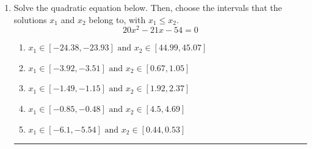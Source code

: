 \documentclass[14pt]{extbook}
\newcommand{\litem}[1]{\item#1\hspace*{-1cm}\rule{\textwidth}{0.4pt}}
\begin{document}
\begin{enumerate}
\litem{
Solve the quadratic equation below. Then, choose the intervals that the solutions $x_1$ and $x_2$ belong to, with $x_1 \leq x_2$.\[ 20x^{2} -21 x -54 = 0 \]\begin{enumerate}[label=\Alph*.]
\item \( x_1 \in [-24.38, -23.93] \text{ and } x_2 \in [44.99, 45.07] \)
\item \( x_1 \in [-3.92, -3.51] \text{ and } x_2 \in [0.67, 1.05] \)
\item \( x_1 \in [-1.49, -1.15] \text{ and } x_2 \in [1.92, 2.37] \)
\item \( x_1 \in [-0.85, -0.48] \text{ and } x_2 \in [4.5, 4.69] \)
\item \( x_1 \in [-6.1, -5.54] \text{ and } x_2 \in [0.44, 0.53] \)


\end{enumerate}}
\end{enumerate}
\end{document}
